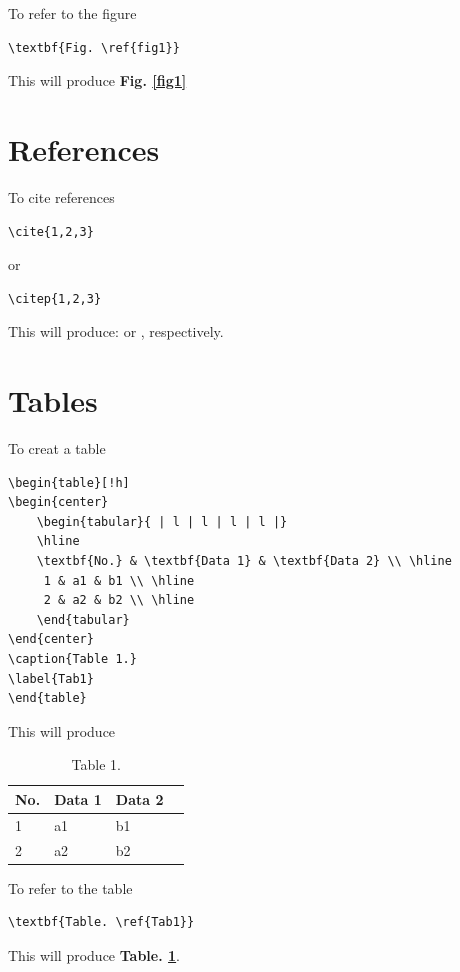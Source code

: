 \noindent To refer to the figure

\begin{verbatim}
\textbf{Fig. \ref{fig1}}
\end{verbatim}

\noindent This will produce \textbf{Fig. \ref{fig1}}

\section{References}

To cite references

\begin{verbatim}
\cite{1,2,3}
\end{verbatim}
or
\begin{verbatim}
\citep{1,2,3}
\end{verbatim}

\noindent This will produce: \cite{1,2,3} or \citep{1,2,3}, respectively.

\section{Tables}

To creat a table

\begin{verbatim}
\begin{table}[!h]
\begin{center}
    \begin{tabular}{ | l | l | l | l |}
    \hline
    \textbf{No.} & \textbf{Data 1} & \textbf{Data 2} \\ \hline
     1 & a1 & b1 \\ \hline
     2 & a2 & b2 \\ \hline
    \end{tabular}
\end{center}
\caption{Table 1.}
\label{Tab1}
\end{table}
\end{verbatim}

\noindent This will produce

\begin{table}[!h]
\begin{center}
    \begin{tabular}{ | l | l | l | l |}
    \hline
    \textbf{No.} & \textbf{Data 1} & \textbf{Data 2} \\ \hline
     1 & a1 & b1 \\ \hline
     2 & a2 & b2 \\ \hline
    \end{tabular}
\end{center}
\caption{Table 1.}
\label{Tab1}
\end{table}

\noindent To refer to the table

\begin{verbatim}
\textbf{Table. \ref{Tab1}}
\end{verbatim}

\noindent This will produce \textbf{Table. \ref{Tab1}}.

\cleardoublepage